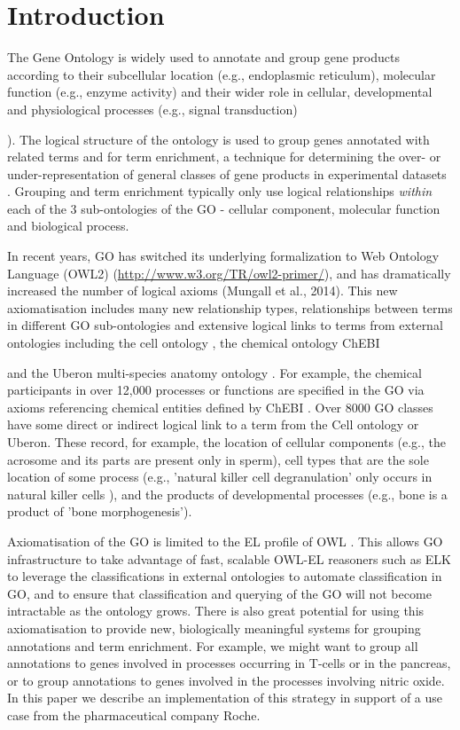 \documentclass[runningheads,a4paper]{llncs}
\begin{document}
\section{Introduction}


The Gene Ontology is widely used to annotate and group gene products according to their subcellular location (e.g., endoplasmic reticulum), molecular function (e.g., enzyme activity) and their wider role in cellular, developmental and physiological processes (e.g., signal transduction) {\cite{GO2015}). The logical structure of the ontology is used to group genes annotated with related terms and for term enrichment, a technique for determining the over- or under-representation of general classes of gene products in experimental datasets \cite{Shah2012}. Grouping and term enrichment typically only use logical relationships \textit{within} each of the 3 sub-ontologies of the GO - cellular component, molecular function and biological process.

In recent years, GO has switched its underlying formalization to Web Ontology Language (OWL2) (\url{http://www.w3.org/TR/owl2-primer/}), and has dramatically increased the number of logical axioms (Mungall et al., 2014). This new axiomatisation includes many new relationship types, relationships between terms in different GO sub-ontologies and extensive logical links to terms from external ontologies including the cell ontology \cite{Meehan2011}, the chemical ontology ChEBI {\cite{Hastings2012} and the Uberon multi-species anatomy ontology \cite{Haendel2014}.  For example, the chemical participants in over 12,000 processes or functions are specified in the GO via axioms referencing chemical entities defined by ChEBI \cite{Hill2013}. Over 8000 GO classes have some direct or indirect logical link to a term from the Cell ontology or Uberon. These record, for example, the location of cellular components (e.g., the acrosome and its parts are present only in sperm), cell types that are the sole location of some process (e.g., 'natural killer cell degranulation' only occurs in natural killer cells ), and the products of developmental processes (e.g., bone is a product of 'bone morphogenesis').

Axiomatisation of the GO is limited to the EL profile of OWL \cite{Mungall2014}. This allows GO infrastructure to take advantage of fast, scalable OWL-EL reasoners such as ELK \cite{kazakov2012} to leverage the classifications in external ontologies to automate classification in GO, and to ensure that classification and querying of the GO will not become intractable as the ontology grows.  There is also great potential for using this axiomatisation to provide new, biologically meaningful systems for grouping annotations and term enrichment.  For example, we might want to group all annotations to genes involved in processes occurring in T-cells or in the pancreas, or to group annotations to genes involved in the processes involving nitric oxide.  In this paper we describe an implementation of this strategy in support of a use case from the pharmaceutical company Roche.

}}
\end{document}
